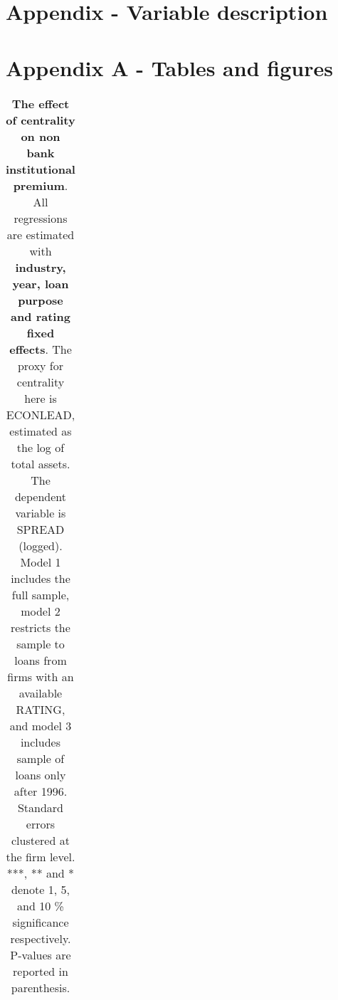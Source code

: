 \documentclass[english, 1p]{elsarticle}
\begin{document}
\section{Appendix - Variable description}




\pagebreak

\section*{Appendix A - Tables and figures}


	\begin{table}[htbp]
		\footnotesize 
		\begin{center}
			\caption{Variables}
			\label{fig: instdescript}
				
		\end{center}
	\end{table}

	\begin{table}[htbp]
		\footnotesize 
		\begin{center}
			\caption{Descriptives all loans}
			\label{fig: instdescript}
				
		\end{center}
	\end{table}

\begin{table}[htbp]
	\footnotesize 
	\begin{center}
		\caption*{Descriptives Institituonal loans}
		\label{fig: instdescript}
			
	\end{center}
\end{table}

\begin{table}[htbp]
	\footnotesize 
	\begin{center}
		\caption*{Descriptives bank only loans}
		\label{fig: instdescript}
			
	\end{center}
\end{table}

\begin{table}[h]\small
	\caption{\textbf{The effect of centrality on non bank institutional premium}.  All regressions are estimated with \textbf{industry, year, loan purpose and rating fixed effects}. The proxy for centrality here is ECONLEAD, estimated as the log of total assets. The dependent variable is SPREAD (logged). Model 1 includes the full sample, model 2 restricts the sample to loans from firms with an available RATING, and model 3 includes sample of loans only after 1996.  Standard errors clustered at the firm level. ***, ** and * denote 1, 5, and 10 \% significance respectively. P-values are reported in parenthesis.} \label{tab:Table2} \centering
	\begin{tabular}{ccccccc}      
		
	\end{tabular}
\end{table}
\end{document}
